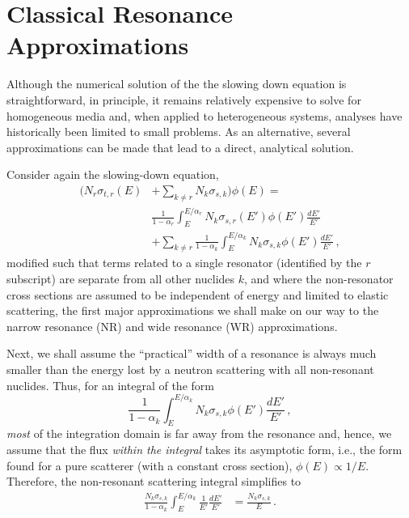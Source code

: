     
\section*{Classical Resonance Approximations}

Although the numerical solution of the the slowing down equation is
straightforward, in principle, it remains relatively expensive 
to solve for homogeneous media and, when applied to heterogeneous systems,
analyses have historically been limited to small problems.  As an
alternative, several approximations can be made that lead to a direct,
analytical solution.

Consider again the slowing-down equation, 
\begin{equation}
\begin{split}
     \Bigg ( N_r \sigma_{t,r}(E) &+ 
             \sum_{k\neq r} N_k \sigma_{s,k} 
     \Bigg ) \phi(E) = \\
       & \frac{1}{1-\alpha_r} 
          \int^{E/\alpha_r}_E N_k \sigma_{s,r} (E') \phi(E') \frac{dE'}{E'} \\
       &+ \sum_{k\neq r} \frac{1}{1-\alpha_k} 
          \int^{E/\alpha_k}_E N_k \sigma_{s,k} \phi(E') \frac{dE'}{E'} \, ,
\end{split}          
\label{eq:sde_general_modified}
\end{equation}
modified such that terms related to a single resonator (identified by 
the $r$ subscript) are separate from all other nuclides $k$, and 
where the non-resonator cross sections are assumed to be independent
of energy and limited to elastic scattering, 
the first major approximations we shall make on our 
way to the narrow resonance (NR) and wide resonance (WR) approximations.

Next, we shall assume the ``practical'' width of a resonance is always
much smaller than the energy lost by a neutron scattering with all 
non-resonant nuclides.  Thus, for an integral of the form
\begin{equation}
 \frac{1}{1-\alpha_k} \int^{E/\alpha_k}_E N_k \sigma_{s,k} \phi(E') \frac{dE'}{E'} \, ,
\end{equation}
\emph{most} of the integration domain is far away from the resonance 
and, hence, we assume that the flux \emph{within the integral} 
takes its asymptotic form, i.e.,
the form found for a pure scatterer (with a constant 
cross section), $\phi(E)\propto 1/E$.  Therefore, 
the non-resonant scattering integral simplifies to
\begin{equation}
\begin{split}
  \frac{N_k \sigma_{s,k}}{1-\alpha_k}  
       \int^{E/\alpha_k}_E  \frac{1}{E'} \frac{dE'}{E'}
  &= \frac{N_k \sigma_{s,k}}{E} \, .
\end{split}          
\label{eq:simple_scattering_integral}
\end{equation}

